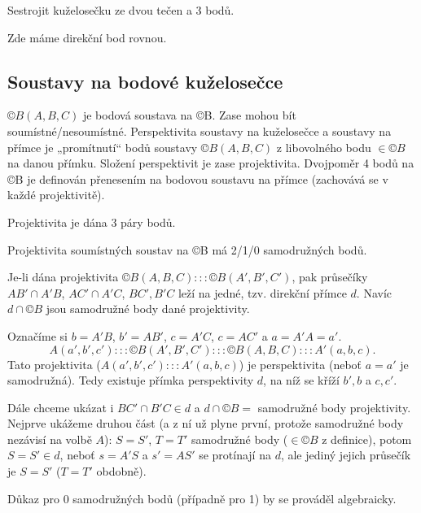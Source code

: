 \documentclass[12pt]{article}					%
\begin{document}
\begin{priklad}[Konstrukce]
	Sestrojit kuželosečku ze dvou tečen a 3 bodů.

	\begin{reseni}
		Zde máme direkční bod rovnou.
	\end{reseni}
\end{priklad}

\subsection{Soustavy na bodové kuželosečce}
\begin{definice}
	$©B(A, B, C)$ je bodová soustava na ©B. Zase mohou bít soumístné/nesoumístné. Perspektivita soustavy na kuželosečce a soustavy na přímce je „promítnutí“ bodů soustavy $©B(A, B, C)$ z libovolného bodu $\in ©B$ na danou přímku. Složení perspektivit je zase projektivita. Dvojpoměr 4 bodů na ©B je definován přenesením na bodovou soustavu na přímce (zachovává se v každé projektivitě).

	\begin{poznamka}
		Projektivita je dána 3 páry bodů.

		Projektivita soumístných soustav na ©B má 2/1/0 samodružných bodů.
	\end{poznamka}
\end{definice}

\begin{veta}
	Je-li dána projektivita $©B(A, B, C) ::: ©B(A', B', C')$, pak průsečíky $AB' \cap A'B$, $AC' \cap A'C$, $BC', B'C$ leží na jedné, tzv. direkční přímce $d$. Navíc $d \cap ©B$ jsou samodružné body dané projektivity.

	\begin{dukazin}
		Označíme si $b = A'B$, $b' = AB'$, $c = A'C$, $c = AC'$ a $a = A'A = a'$.
		$$ A(a', b', c') ::: ©B(A', B', C') ::: ©B(A, B, C) ::: A'(a, b, c). $$
		Tato projektivita ($A(a', b', c') ::: A'(a, b, c)$) je perspektivita (neboť $a = a'$ je samodružná). Tedy existuje přímka perspektivity $d$, na níž se kříží $b', b$ a $c, c'$.

		Dále chceme ukázat i $BC' \cap B'C \in d$ a $d \cap ©B = $ samodružné body projektivity. Nejprve ukážeme druhou část (a z ní už plyne první, protože samodružné body nezávisí na volbě $A$): $S = S'$, $T = T'$ samodružné body ($\in ©B$ z definice), potom $S = S' \in d$, neboť $s = A'S$ a $s' = AS'$ se protínají na $d$, ale jediný jejich průsečík je $S = S'$ ($T = T'$ obdobně).
	\end{dukazin}

	\begin{dukazin}
		Důkaz pro 0 samodružných bodů (případně pro 1) by se prováděl algebraicky.
	\end{dukazin}
\end{veta}
\end{document}

